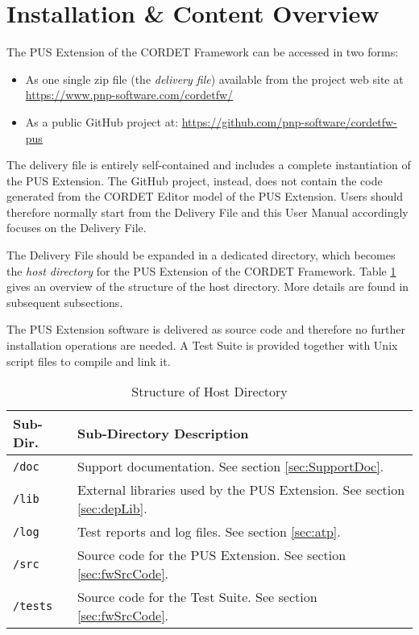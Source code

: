 \documentclass{pnp_article}
\begin{document}
\newpage
{}

\section{Installation \& Content Overview}\label{sec:InstAndContentOverview}
The PUS Extension of the CORDET Framework can be accessed in two forms:

\begin{itemize}
\item As one single zip file (the \emph{delivery file}) available from the project web site at \url{https://www.pnp-software.com/cordetfw/}
\item As a public GitHub project at: \url{https://github.com/pnp-software/cordetfw-pus}
\end{itemize}

The delivery file is entirely self-contained and includes a complete instantiation of the PUS Extension. The GitHub project, instead, does not contain the code generated from the CORDET Editor model of the PUS Extension. Users should therefore normally start from the Delivery File and this User Manual accordingly focuses on the Delivery File. 

The Delivery File should be expanded in a dedicated directory, which becomes the \emph{host directory} for the PUS Extension of the CORDET Framework.
Table \ref{tab:HostDir} gives an overview of the structure of the host directory.
More details are found in subsequent subsections.

The PUS Extension software is delivered as source code and therefore no further installation operations are needed. A Test Suite is provided together with Unix script files to compile and link it.

\begin{longtable}{|l|p{11cm}|}
\caption{Structure of Host Directory}\label{tab:HostDir} \\
\hline
\rowcolor{light-gray}
\textbf{Sub-Dir.} & \textbf{Sub-Directory Description}\\
\hline\hline
\texttt{/doc} & Support documentation. See section \ref{sec:SupportDoc}.\\
\hline
\texttt{/lib} & External libraries used by the PUS Extension. See section \ref{sec:depLib}.\\
\hline
\texttt{/log} & Test reports and log files. See section \ref{sec:atp}.\\
\hline
\texttt{/src} & Source code for the PUS Extension. See section \ref{sec:fwSrcCode}.\\
\hline
\texttt{/tests} & Source code for the Test Suite. See section \ref{sec:fwSrcCode}.\\
\hline
\end{longtable}
\end{document}
